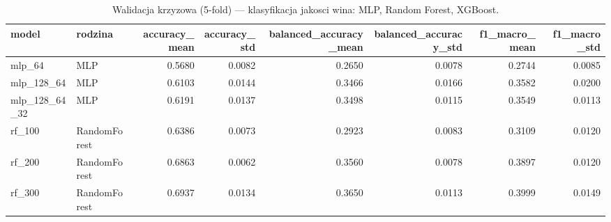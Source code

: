 \begin{table}
\caption{Walidacja krzyzowa (5-fold) — klasyfikacja jakosci wina: MLP, Random Forest, XGBoost.}
\label{tab:szczegolowe}
\begin{tabular}{llrrrrrr}
\toprule
model & rodzina & accuracy\_mean & accuracy\_std & balanced\_accuracy\_mean & balanced\_accuracy\_std & f1\_macro\_mean & f1\_macro\_std \\
\midrule
mlp\_64 & MLP & 0.5680 & 0.0082 & 0.2650 & 0.0078 & 0.2744 & 0.0085 \\
mlp\_128\_64 & MLP & 0.6103 & 0.0144 & 0.3466 & 0.0166 & 0.3582 & 0.0200 \\
mlp\_128\_64\_32 & MLP & 0.6191 & 0.0137 & 0.3498 & 0.0115 & 0.3549 & 0.0113 \\
rf\_100 & RandomForest & 0.6386 & 0.0073 & 0.2923 & 0.0083 & 0.3109 & 0.0120 \\
rf\_200 & RandomForest & 0.6863 & 0.0062 & 0.3560 & 0.0078 & 0.3897 & 0.0120 \\
rf\_300 & RandomForest & 0.6937 & 0.0134 & 0.3650 & 0.0113 & 0.3999 & 0.0149 \\
\bottomrule
\end{tabular}
\end{table}
